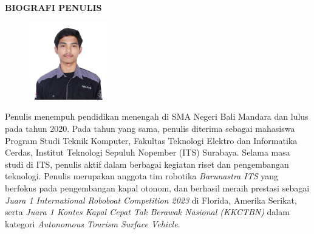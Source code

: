 \begin{center}
  \Large
  \textbf{BIOGRAFI PENULIS}
\end{center}


\vspace{2ex}

\begin{figure}
  \centering
  \vspace{-3ex}
  \includegraphics[width=0.3\textwidth]{gambar/my.jpg}
  \vspace{-4ex}
\end{figure}


Penulis menempuh pendidikan menengah di SMA Negeri Bali Mandara dan lulus pada tahun 2020. Pada tahun yang sama, penulis diterima sebagai mahasiswa Program Studi Teknik Komputer, Fakultas Teknologi Elektro dan Informatika Cerdas, Institut Teknologi Sepuluh Nopember (ITS) Surabaya. Selama masa studi di ITS, penulis aktif dalam berbagai kegiatan riset dan pengembangan teknologi. Penulis merupakan anggota tim robotika \emph{Barunastra ITS} yang berfokus pada pengembangan kapal otonom, dan berhasil meraih prestasi sebagai \emph{Juara 1 International Roboboat Competition 2023} di Florida, Amerika Serikat, serta \emph{Juara 1 Kontes Kapal Cepat Tak Berawak Nasional (KKCTBN)} dalam kategori \emph{Autonomous Tourism Surface Vehicle}.

